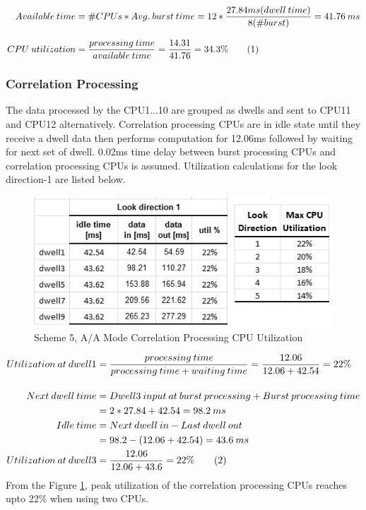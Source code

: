 \begin{align*}
	Available \: time &= \#CPUs * Avg. \: burst \: time = 12 * \frac{27.84ms (dwell \: time)}{8(\#burst)} = 41.76 \: ms\\[0.3cm]
	CPU \: utilization &= \frac{processing \: time}{available \: time} = \frac{14.31}{41.76} = 34.3\% \stepcounter{equation}\tag{\theequation} 
\end{align*}


\subsubsection{Correlation Processing} 
The data processed by the CPU1...10 are grouped as dwells and sent to CPU11 and CPU12 alternatively. Correlation processing CPUs are in idle state until they receive a dwell data then performs computation for 12.06ms followed by waiting for next set of dwell. 0.02ms time delay between burst processing CPUs and correlation processing CPUs is assumed. Utilization calculations for the look direction-1 are listed below. 

\begin{figure}[h!]
	\centering
	\includegraphics[]{figures/scheme5_mul_cpu_util}
	\caption{Scheme 5, A/A Mode Correlation Processing CPU Utilization}
	\label{fig:mm:scheme5_mul_cpu_util}
\end{figure}

\begin{align*}
	Utilization \: at \: dwell1 &= \frac{processing \: time}{processing \: time + waiting \: time } = \frac{12.06}{12.06 + 42.54} = 22\% \\[0.4cm]
	Next \: dwell \: time &= Dwell3 \: input \: at \: burst \: processing + Burst \: processing \: time \\
	&= 2 * 27.84 + 42.54 = 98.2 \: ms\\
	Idle \: time &= Next \: dwell \: in - Last \: dwell \: out \\
	&= 98.2 - (12.06 + 42.54) = 43.6 \: ms \\
	Utilization \: at \: dwell3 &=  \frac{12.06}{12.06 + 43.6} = 22\%  \stepcounter{equation}\tag{\theequation}
\end{align*}
From the Figure \ref{fig:mm:scheme5_mul_cpu_util}, peak utilization of the correlation processing CPUs reaches upto 22\% when using two CPUs. 

